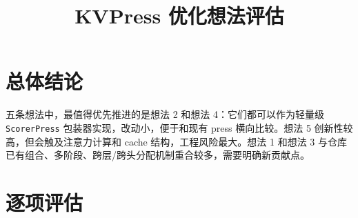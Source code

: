 \documentclass[UTF8]{ctexart}
\title{KVPress 优化想法评估}
\author{}
\date{}
\begin{document}
\maketitle

\section*{总体结论}

五条想法中，最值得优先推进的是想法 2 和想法 4：它们都可以作为轻量级
\texttt{ScorerPress} 包装器实现，改动小，便于和现有 press 横向比较。想法 5
创新性较高，但会触及注意力计算和 cache 结构，工程风险最大。想法 1 和想法
3 与仓库已有组合、多阶段、跨层/跨头分配机制重合较多，需要明确新贡献点。

\section*{逐项评估}
\end{document}
